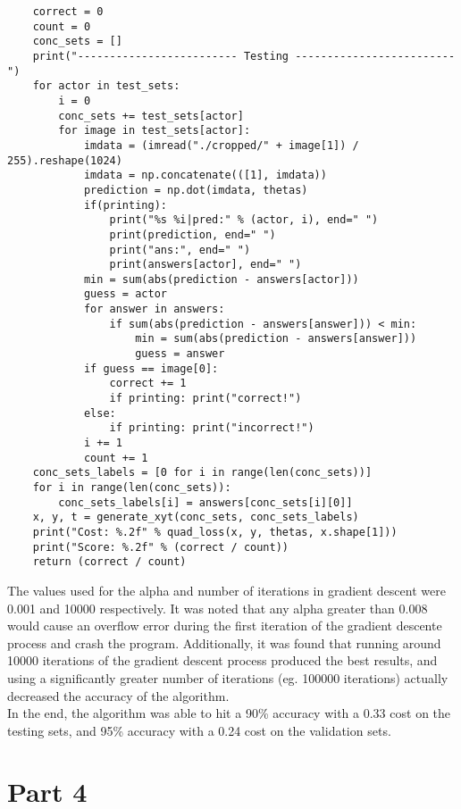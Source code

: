 \documentclass[11pt,a4paper]{report}
\begin{document}
\begin{enumerate}
\begin{lstlisting}
    correct = 0
    count = 0
    conc_sets = []
    print("------------------------- Testing -------------------------")
    for actor in test_sets:
        i = 0
        conc_sets += test_sets[actor]
        for image in test_sets[actor]:
            imdata = (imread("./cropped/" + image[1]) / 255).reshape(1024)
            imdata = np.concatenate(([1], imdata))
            prediction = np.dot(imdata, thetas)
            if(printing):
                print("%s %i|pred:" % (actor, i), end=" ")
                print(prediction, end=" ")
                print("ans:", end=" ")
                print(answers[actor], end=" ")
            min = sum(abs(prediction - answers[actor]))
            guess = actor
            for answer in answers:
                if sum(abs(prediction - answers[answer])) < min:
                    min = sum(abs(prediction - answers[answer]))
                    guess = answer
            if guess == image[0]:
                correct += 1
                if printing: print("correct!")
            else:
                if printing: print("incorrect!")
            i += 1
            count += 1
    conc_sets_labels = [0 for i in range(len(conc_sets))]
    for i in range(len(conc_sets)):
        conc_sets_labels[i] = answers[conc_sets[i][0]]
    x, y, t = generate_xyt(conc_sets, conc_sets_labels)
    print("Cost: %.2f" % quad_loss(x, y, thetas, x.shape[1]))
    print("Score: %.2f" % (correct / count))
    return (correct / count)
\end{lstlisting}
\end{enumerate}

The values used for the alpha and number of iterations in gradient descent were 0.001 and 10000 respectively. It was noted that any alpha greater than 0.008 would cause an overflow error during the first iteration of the gradient descente process and crash the program. Additionally, it was found that running around 10000 iterations of the gradient descent process produced the best results, and using a significantly greater number of iterations (eg. 100000 iterations) actually decreased the accuracy of the algorithm.\\

In the end, the algorithm was able to hit a 90\% accuracy with a 0.33 cost on the testing sets, and 95\% accuracy with a 0.24 cost on the validation sets.

\section*{Part 4}
\end{document}
